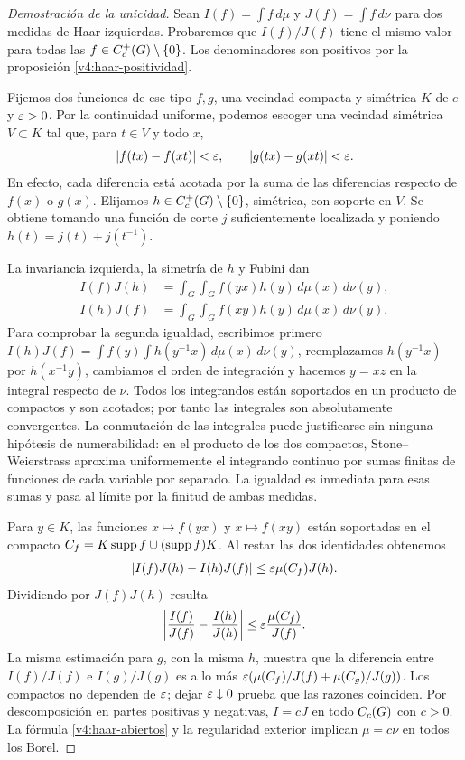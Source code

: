 \begin{proof}[Demostración de la unicidad]\label{lectura:v4-19}
Sean $I(f)=\int f\,d\mu$ y $J(f)=\int f\,d\nu$ para dos medidas de Haar izquierdas. Probaremos que $I(f)/J(f)$ tiene el mismo valor para todas las $f\in C_c^+(G)\setminus\{0\}$. Los denominadores son positivos por la proposición \ref{v4:haar-positividad}.

Fijemos dos funciones de ese tipo $f,g$, una vecindad compacta y simétrica $K$ de $e$ y $\varepsilon>0$. Por la continuidad uniforme, podemos escoger una vecindad simétrica $V\subset K$ tal que, para $t\in V$ y todo $x$,
\[
 |f(tx)-f(xt)|<\varepsilon,\qquad |g(tx)-g(xt)|<\varepsilon.
\]
En efecto, cada diferencia está acotada por la suma de las diferencias respecto de $f(x)$ o $g(x)$. Elijamos $h\in C_c^+(G)\setminus\{0\}$, simétrica, con soporte en $V$. Se obtiene tomando una función de corte $j$ suficientemente localizada y poniendo $h(t)=j(t)+j(t^{-1})$.

La invariancia izquierda, la simetría de $h$ y Fubini dan
\begin{align*}
 I(f)J(h)&=\int_G\int_G f(yx)h(y)\,d\mu(x)\,d\nu(y),\\
 I(h)J(f)&=\int_G\int_G f(xy)h(y)\,d\mu(x)\,d\nu(y).
\end{align*}
Para comprobar la segunda igualdad, escribimos primero
$I(h)J(f)=\int f(y)\int h(y^{-1}x)\,d\mu(x)\,d\nu(y)$,
reemplazamos $h(y^{-1}x)$ por $h(x^{-1}y)$, cambiamos el orden de integración y hacemos $y=xz$ en la integral respecto de $\nu$. Todos los integrandos están soportados en un producto de compactos y son acotados; por tanto las integrales son absolutamente convergentes. La conmutación de las integrales puede justificarse sin ninguna hipótesis de numerabilidad: en el producto de los dos compactos, Stone--Weierstrass aproxima uniformemente el integrando continuo por sumas finitas de funciones de cada variable por separado. La igualdad es inmediata para esas sumas y pasa al límite por la finitud de ambas medidas.

Para $y\in K$, las funciones $x\mapsto f(yx)$ y $x\mapsto f(xy)$ están soportadas en el compacto
$C_f=K\operatorname{supp} f\cup(\operatorname{supp} f)K$. Al restar las dos identidades obtenemos
\[
 |I(f)J(h)-I(h)J(f)|\leq\varepsilon\mu(C_f)J(h).
\]
Dividiendo por $J(f)J(h)$ resulta
\[
 \left|\frac{I(f)}{J(f)}-\frac{I(h)}{J(h)}\right|
 \leq\varepsilon\frac{\mu(C_f)}{J(f)}.
\]
La misma estimación para $g$, con la misma $h$, muestra que la diferencia entre $I(f)/J(f)$ e $I(g)/J(g)$ es a lo más
$\varepsilon(\mu(C_f)/J(f)+\mu(C_g)/J(g))$. Los compactos no dependen de $\varepsilon$; dejar $\varepsilon\downarrow0$ prueba que las razones coinciden. Por descomposición en partes positivas y negativas, $I=cJ$ en todo $C_c(G)$ con $c>0$. La fórmula \eqref{v4:haar-abiertos} y la regularidad exterior implican $\mu=c\nu$ en todos los Borel.
\end{proof}

